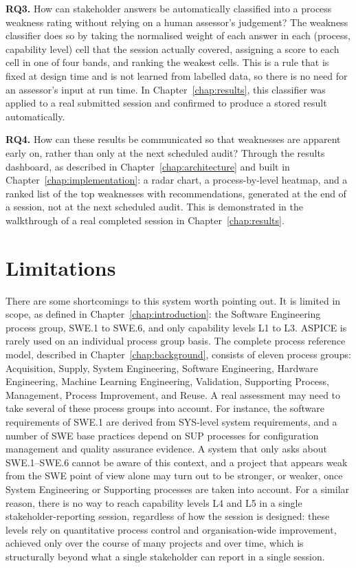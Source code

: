 \documentclass[a4paper, 12pt, oneside, openany, BCOR1cm,toc=chapterentrywithdots]{scrbook}
\begin{document}
\textbf{RQ3.} How can stakeholder answers be automatically classified into a process weakness
rating without relying on a human assessor's judgement? The weakness classifier does so by
taking the normalised weight of each answer in each (process, capability level) cell that the
session actually covered, assigning a score to each cell in one of four bands, and ranking the
weakest cells. This is a rule that is fixed at design time and is not learned from labelled
data, so there is no need for an assessor's input at run time. In Chapter~\ref{chap:results},
this classifier was applied to a real submitted session and confirmed to produce a stored
result automatically.

\textbf{RQ4.} How can these results be communicated so that weaknesses are apparent early on,
rather than only at the next scheduled audit? Through the results dashboard, as described in
Chapter~\ref{chap:architecture} and built in Chapter~\ref{chap:implementation}: a radar chart, a
process-by-level heatmap, and a ranked list of the top weaknesses with recommendations,
generated at the end of a session, not at the next scheduled audit. This is demonstrated in the
walkthrough of a real completed session in Chapter~\ref{chap:results}.

\section{Limitations}

There are some shortcomings to this system worth pointing out. It is limited in scope, as
defined in Chapter~\ref{chap:introduction}: the Software Engineering process group, SWE.1 to
SWE.6, and only capability levels L1 to L3. ASPICE is rarely used on an individual process group
basis. The complete process reference model, described in Chapter~\ref{chap:background},
consists of eleven process groups: Acquisition, Supply, System Engineering, Software
Engineering, Hardware Engineering, Machine Learning Engineering, Validation, Supporting Process,
Management, Process Improvement, and Reuse. A real assessment may need to take several of these
process groups into account. For instance, the software requirements of SWE.1 are derived from
SYS-level system requirements, and a number of SWE base practices depend on SUP processes for
configuration management and quality assurance evidence. A system that only asks about
SWE.1--SWE.6 cannot be aware of this context, and a project that appears weak from the SWE point
of view alone may turn out to be stronger, or weaker, once System Engineering or Supporting
processes are taken into account. For a similar reason, there is no way to reach capability
levels L4 and L5 in a single stakeholder-reporting session, regardless of how the session is
designed: these levels rely on quantitative process control and organisation-wide improvement,
achieved only over the course of many projects and over time, which is structurally beyond what
a single stakeholder can report in a single session.
\end{document}
